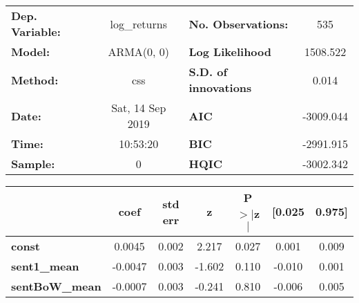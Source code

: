 \begin{center}
\begin{tabular}{lclc}
\toprule
\textbf{Dep. Variable:} &   log\_returns   & \textbf{  No. Observations:  } &    535      \\
\textbf{Model:}         &    ARMA(0, 0)    & \textbf{  Log Likelihood     } &  1508.522   \\
\textbf{Method:}        &       css        & \textbf{  S.D. of innovations} &   0.014     \\
\textbf{Date:}          & Sat, 14 Sep 2019 & \textbf{  AIC                } & -3009.044   \\
\textbf{Time:}          &     10:53:20     & \textbf{  BIC                } & -2991.915   \\
\textbf{Sample:}        &        0         & \textbf{  HQIC               } & -3002.342   \\
\bottomrule
\end{tabular}
\begin{tabular}{lcccccc}
                       & \textbf{coef} & \textbf{std err} & \textbf{z} & \textbf{P$> |$z$|$} & \textbf{[0.025} & \textbf{0.975]}  \\
\midrule
\textbf{const}         &       0.0045  &        0.002     &     2.217  &         0.027        &        0.001    &        0.009     \\
\textbf{sent1\_mean}   &      -0.0047  &        0.003     &    -1.602  &         0.110        &       -0.010    &        0.001     \\
\textbf{sentBoW\_mean} &      -0.0007  &        0.003     &    -0.241  &         0.810        &       -0.006    &        0.005     \\
\bottomrule
\end{tabular}
\end{center}
